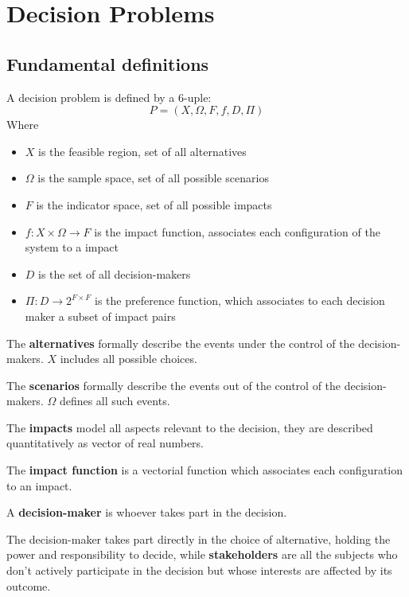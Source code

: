 \section{Decision Problems}

\subsection{Fundamental definitions}

A decision problem is defined by a 6-uple: 
$$ P = (X, \Omega, F, f, D, \Pi)$$
Where
\begin{itemize}
	\item $X$ is the feasible region, set of all alternatives
	
	\item $\Omega$ is the sample space, set of all possible scenarios
	
	\item $F$ is the indicator space, set of all possible impacts 
	
	\item $f: X \times \Omega \rightarrow F$ is the impact function, associates each configuration of the system to a impact
	
	\item $D$ is the set of all decision-makers
	
	\item $\Pi: D \rightarrow 2^{F \times F}$ is the preference function, which associates to each decision maker a subset of impact pairs
\end{itemize}

The \textbf{alternatives} formally describe the events under the control of the decision-makers. $X$ includes all possible choices.

The \textbf{scenarios} formally describe the events out of the control of the decision-makers. $\Omega$ defines all such events.

The \textbf{impacts} model all aspects relevant to the decision, they are described quantitatively as vector of real numbers.

The \textbf{impact function} is a vectorial function which associates each configuration to an impact.

A \textbf{decision-maker} is whoever takes part in the decision. 

The decision-maker takes part directly in the choice of alternative, holding the power and responsibility to decide, while \textbf{stakeholders} are all the subjects who don't actively participate in the decision but whose interests are affected by its outcome.

